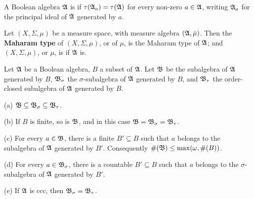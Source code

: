  A Boolean algebra $\frak A$ is {\bf\Mth} if
$\tau(\frak A_a)=\tau(\frak A)$ for every non-zero
$a\in\frak A$, writing $\frak A_a$ for the principal ideal of $\frak A$
generated by $a$.

 Let $(X,\Sigma,\mu)$ be a measure space, with
measure algebra $(\frak A,\bar\mu)$.   Then the {\bf Maharam type} of
$(X,\Sigma,\mu)$, or of $\mu$, is the Maharam type of $\frak A$;  and
$(X,\Sigma,\mu)$, or $\mu$, is {\bf\Mth} if $\frak A$ is.


 Let $\frak A$ be a Boolean algebra, $B$ a
subset of $\frak A$.   Let $\frak B$ be the subalgebra of $\frak A$
generated by $B$, $\frak B_{\sigma}$ the
$\sigma$-subalgebra of $\frak A$ generated by $B$, and $\frak B_{\tau}$
the order-closed subalgebra of $\frak A$ generated by $B$.

(a) $\frak B\subseteq\frak B_{\sigma}\subseteq\frak B_{\tau}$.

(b) If $B$ is finite, so is $\frak B$, and in this case
$\frak B=\frak B_{\sigma}=\frak B_{\tau}$.

(c) For every $a\in\frak B$, there is a finite $B'\subseteq B$ such that
$a$ belongs to the subalgebra of $\frak A$ generated by $B'$.
Consequently $\#(\frak B)\le\max(\omega,\#(B))$.

(d) For every $a\in\frak B_{\sigma}$, there is a countable
$B'\subseteq B$ such that $a$ belongs to the $\sigma$-subalgebra of
$\frak A$ generated by $B'$.

(e) If $\frak A$ is ccc, then $\frak B_{\sigma}=\frak B_{\tau}$.


